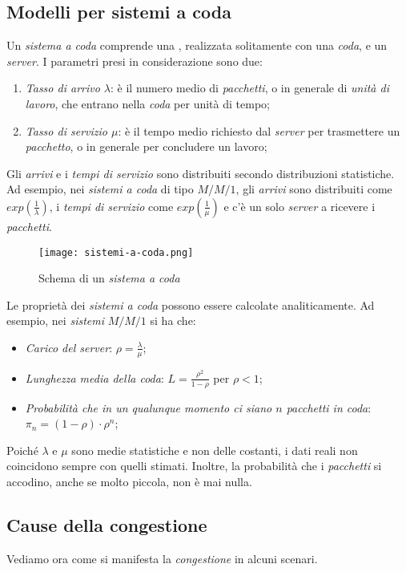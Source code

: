 \subsection{Modelli per sistemi a coda}
Un \emph{sistema a coda} comprende una , realizzata
solitamente con una \emph{coda}, e un \emph{server}. I parametri presi in
considerazione sono due:
\begin{enumerate}
    \item \emph{Tasso di arrivo $\lambda$}: è il numero medio di \emph{pacchetti},
    o in generale di \emph{unità di lavoro}, che entrano nella \emph{coda} per
    unità di tempo;
    \item \emph{Tasso di servizio $\mu$}: è il tempo medio richiesto dal
    \emph{server} per trasmettere un \emph{pacchetto}, o in generale per concludere
    un lavoro;
\end{enumerate}\noindent
Gli \emph{arrivi} e i \emph{tempi di servizio} sono distribuiti secondo
distribuzioni statistiche. Ad esempio, nei \emph{sistemi a coda} di tipo
$M/M/1$\footnotemark, gli \emph{arrivi} sono distribuiti come $exp\left(\frac{1}
{\lambda}\right)$, i \emph{tempi di servizio} come $exp\left(\frac{1}{\mu}\right)$
e c'è un solo \emph{server} a ricevere i \emph{pacchetti}.

\begin{figure}[h!]
    \centering
    \texttt{[image: sistemi-a-coda.png]}
    \caption{Schema di un \emph{sistema a coda}}
\end{figure}\noindent
Le proprietà dei \emph{sistemi a coda} possono essere calcolate analiticamente.
Ad esempio, nei \emph{sistemi} $M/M/1$ si ha che:
\begin{itemize}
    \item \emph{Carico del server}: $\rho=\frac{\lambda}{\mu}$;
    \item \emph{Lunghezza media della coda}: $L=\frac{\rho^2}{1-\rho}$ per $\rho<1$;
    \item \emph{Probabilità che in un qualunque momento ci siano $n$ pacchetti in
    coda}: $\pi_n=(1-\rho)\cdot\rho^n$;
\end{itemize}
Poiché $\lambda$ e $\mu$ sono medie statistiche e non delle costanti, i dati
reali non coincidono sempre con quelli stimati. Inoltre, la probabilità che i
\emph{pacchetti} si accodino, anche se molto piccola, non è mai nulla.

\subsection{Cause della congestione}
Vediamo ora come si manifesta la \emph{congestione} in alcuni scenari.

